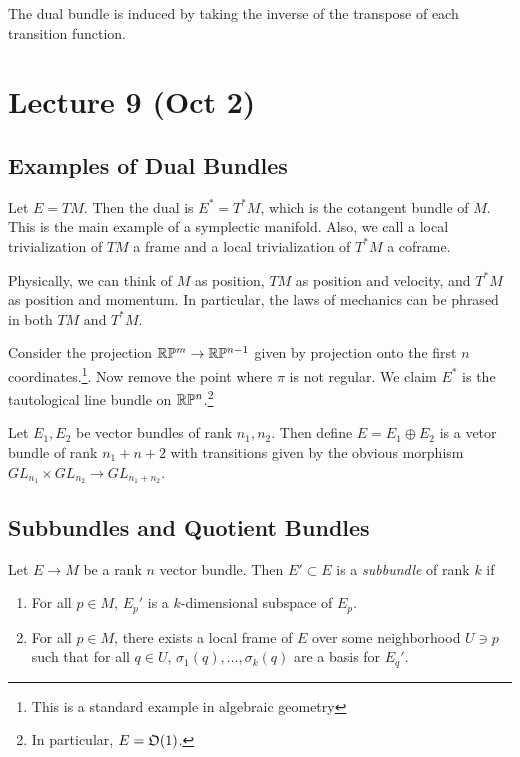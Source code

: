\documentclass[twoside, 10pt]{article}
\begin{document}
    \begin{exm}
        The dual bundle is induced by taking the inverse of the transpose of each transition function.
    \end{exm}

    \section{Lecture 9 (Oct 2)}%
    \label{sec:lecture_9_oct_2_}
    
    \subsection{Examples of Dual Bundles}%
    \label{sub:examples_of_dual_bundles}
    
    \begin{exm}
        Let $E = TM$. Then the dual is $E^* = T^*M$, which is the cotangent bundle of $M$. This is the main example of a symplectic manifold. Also, we call a local trivialization of $TM$ a frame and a local trivialization of $T^*M$ a coframe.

        Physically, we can think of $M$ as position, $TM$ as position and velocity, and $T^*M$ as position and momentum. In particular, the laws of mechanics can be phrased in both $TM$ and $T^*M$.
    \end{exm}

    \begin{exm}
        Consider the projection $\mathbb{R}\mathbb{P}^m \to \mathbb{R}\mathbb{P}^{n-1}$ given by projection onto the first $n$ coordinates.\footnote{This is a standard example in algebraic geometry}. Now remove the point where $\pi$ is not regular. We claim $E^*$ is the tautological line bundle on $\mathbb{R}\mathbb{P}^n$.\footnote{In particular, $E = \mathfrak{O}(1)$.}
    \end{exm}
    
    \begin{exm}
        Let $E_1, E_2$ be vector bundles of rank $n_1, n_2$. Then define $E = E_1 \oplus E_2$ is a vetor bundle of rank $n_1 + n+2$ with transitions given by the obvious morphism $GL_{n_1} \times GL_{n_2} \to GL_{n_1+n_2}$.
    \end{exm}

    \subsection{Subbundles and Quotient Bundles}%
    \label{sub:subbundles_and_quotient_bundles}
    
    \begin{defn}
        Let $E \to M$ be a rank $n$ vector bundle. Then $E' \subset E$ is a \textit{subbundle} of rank $k$ if
        \begin{enumerate}
            \item For all $p \in M$, $E_p'$ is a $k$-dimensional subspace of $E_p$.
            \item For all $p \in M$, there exists a local frame of $E$ over some neighborhood $U \ni p$ such that for all $q \in U$, $\sigma_1(q), \ldots, \sigma_k(q)$ are a basis for $E_q'$.
        \end{enumerate}
    \end{defn}
\end{document}
